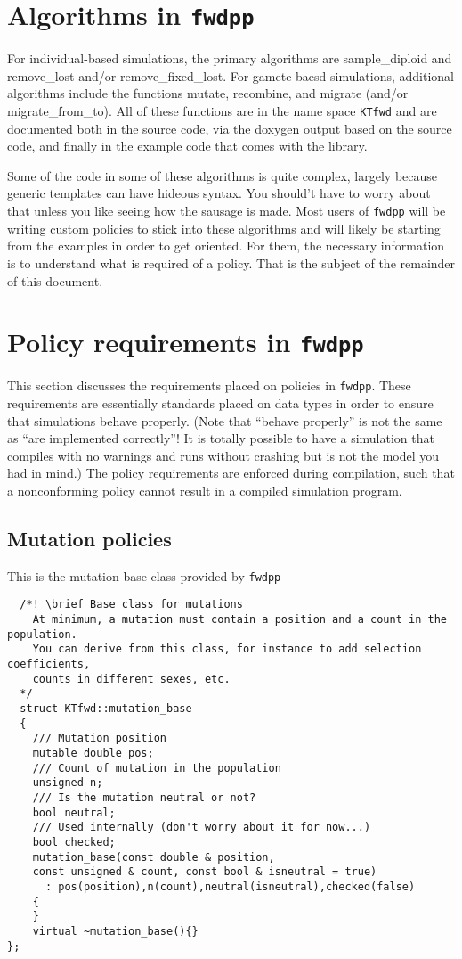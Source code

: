 \documentclass{article}
\begin{document}
\section{Algorithms in \texttt{fwdpp}}
For individual-based simulations, the primary algorithms are sample\_diploid and remove\_lost and/or remove\_fixed\_lost.  For gamete-baesd simulations, additional algorithms include the functions mutate, recombine, and migrate (and/or migrate\_from\_to).  All of these functions are in the name space \texttt{KTfwd} and are documented both in the source code, via the doxygen output based on the source code, and finally in the example code that comes with the library.

Some of the code in some of these algorithms is quite complex, largely because generic templates can have hideous syntax.  You should't have to worry about that unless you like seeing how the sausage is made.  Most users of \texttt{fwdpp} will be writing custom policies to stick into these algorithms and will likely be starting from the examples in order to get oriented.  For them, the necessary information is to understand what is required of a policy.  That is the subject of the remainder of this document.

\section{Policy requirements in \texttt{fwdpp}}
This section discusses the requirements placed on policies in \texttt{fwdpp}.  These requirements are essentially standards placed on data types in order to ensure that simulations behave properly. (Note that ``behave properly'' is not the same as ``are implemented correctly''!  It is totally possible to have a simulation that compiles with no warnings and runs without crashing but is not the model you had in mind.)  The policy requirements are enforced during compilation, such that a nonconforming policy cannot result in a compiled simulation program.

\subsection{Mutation policies}
This is the mutation base class  provided by \texttt{fwdpp}
\begin{lstlisting}
  /*! \brief Base class for mutations
    At minimum, a mutation must contain a position and a count in the population.	
    You can derive from this class, for instance to add selection coefficients,
    counts in different sexes, etc.
  */
  struct KTfwd::mutation_base
  {
    /// Mutation position
    mutable double pos;
    /// Count of mutation in the population
    unsigned n;
    /// Is the mutation neutral or not?
    bool neutral;
    /// Used internally (don't worry about it for now...)
    bool checked;
    mutation_base(const double & position, 
    const unsigned & count, const bool & isneutral = true)
      : pos(position),n(count),neutral(isneutral),checked(false)
    {	
    }
    virtual ~mutation_base(){}
};
\end{lstlisting}
\end{document}
